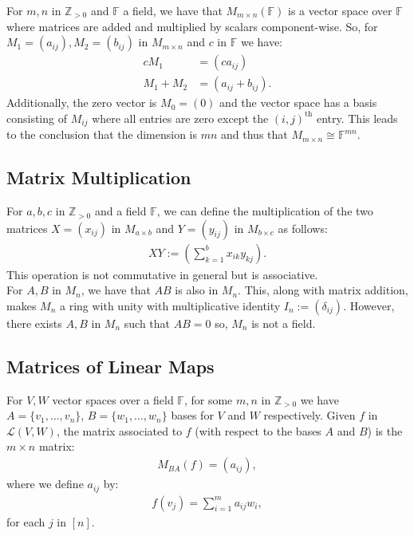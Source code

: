 \documentclass[a4paper, 12pt, twoside]{article}
\begin{document}
For $m, n$ in $\mathbb{Z}_{>0}$ and $\mathbb{F}$ a field, we have
that $M_{m \times n}(\mathbb{F})$ is a vector space over $\mathbb{F}$
where matrices are added and multiplied by scalars component-wise.
So, for \newline $M_1 = (a_{ij}), M_2 = (b_{ij})$ in $M_{m\times n}$
and $c$ in $\mathbb{F}$ we have:
\begin{align*}
  cM_1 &= (ca_{ij}) \\
  M_1 + M_2 &= (a_{ij} + b_{ij}).
\end{align*} Additionally, the zero vector is $M_0 = (0)$ and the vector
space has a basis consisting of $M_{ij}$ where all entries are zero
except the $(i, j)^{\text{th}}$ entry. This leads to the conclusion
that the dimension is $mn$ and thus that 
$M_{m \times n} \cong \mathbb{F}^{mn}$.

\subsection{Matrix Multiplication}

For $a, b, c$ in $\mathbb{Z}_{>0}$ and a field $\mathbb{F}$, 
we can define the multiplication of the two matrices $X = (x_{ij})$ in
$M_{a \times b}$ and $Y = (y_{ij})$ in $M_{b \times c}$ as follows: 
\begin{gather*}
  XY := (\sum_{k = 1}^b x_{ik}y_{kj}).
\end{gather*} This operation is not commutative in general but is
associative.
\\[\baselineskip]
For $A, B$ in $M_n$, we have that $AB$ is also in $M_n$. This,
along with matrix addition, makes $M_n$ a ring with unity with
multiplicative identity $I_n := (\delta_{ij})$. However, there exists
$A, B$ in $M_n$ such that $AB=0$ so, $M_n$ is not a field.

\subsection{Matrices of Linear Maps}

For $V, W$ vector spaces over a field $\mathbb{F}$, for some
$m, n$ in $\mathbb{Z}_{>0}$ we have $A = \{v_1, \ldots, v_n\}$,
$B = \{w_1, \ldots, w_n\}$ bases for $V$ and $W$ respectively.
Given $f$ in $\mathcal{L}(V, W)$, the matrix associated to $f$
(with respect to the bases $A$ and $B$) is the $m \times n$ matrix:
\begin{gather*}
  M_{BA}(f) = (a_{ij}),
\end{gather*} where we define $a_{ij}$ by: \begin{gather*}
  f(v_j) = \sum_{i = 1}^m a_{ij}w_i,
\end{gather*} for each $j$ in $[n]$.
\end{document}

